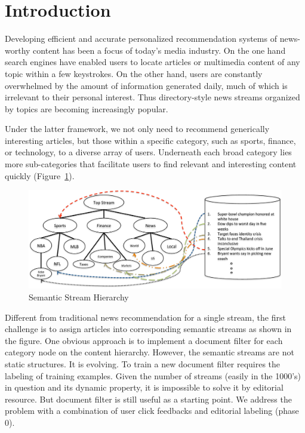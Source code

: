 \documentclass{sig-alternate}
\begin{document}
\section{Introduction}



Developing efficient and accurate personalized recommendation systems of 
news-worthy content has been a focus of today's media industry. 
On the one hand search engines have enabled users to locate articles or 
multimedia content of any topic within a few keystrokes. On the other hand, 
users are constantly overwhelmed by the amount of information generated 
daily, much of which is irrelevant to their personal interest. Thus 
directory-style news streams organized by topics are becoming increasingly 
popular. 

Under the latter framework, we not only need to recommend generically interesting articles, but those within a specific category, such as sports, finance, or technology, to a diverse array of users. Underneath each broad category lies more sub-categories that facilitate users to find relevant and interesting content quickly (Figure~\ref{hierarchy}).
\begin{figure}
\centering
\includegraphics[scale=0.5]{Hierarchy.pdf}
\caption{Semantic Stream Hierarchy} \label{hierarchy}
\end{figure}

Different from traditional news recommendation for a single stream, the first 
challenge is to assign articles into corresponding semantic streams as shown 
in the figure. One obvious approach is to implement a document filter for each 
category node on the content hierarchy.  However, the semantic streams are not 
static structures. It is evolving. To train a new document filter requires the 
labeling of training 
examples. Given the number of streams (easily in the 1000's) in question and 
its dynamic property, it is impossible to solve it by editorial resource.
But document filter is still useful as a starting point. We address the 
problem with a combination of user click feedbacks and editorial labeling 
(phase 0).
\end{document}
